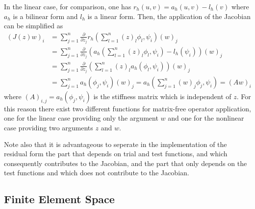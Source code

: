 \documentclass[a4paper,12pt]{article}
\begin{document}
In the linear case, for comparison, one has $r_h(u,v) = a_h(u,v) - l_h(v)$ where
$a_h$ is a bilinear form and $l_h$ is a linear form. Then, the application
of the Jacobian can be simplified as
\begin{equation*}
\begin{split}
(J(z) w)_i &= \sum_{j=1}^n
\frac{\partial}{\partial z_j} r_h\left(\sum_{l=1}^n (z)_l  \phi_l,\psi_i\right) (w)_j \\
&= \sum_{j=1}^n \frac{\partial}{\partial z_j} \left(
a_h\left(\sum_{l=1}^n (z)_l  \phi_l,\psi_i\right) - l_h(\psi_i)\right) (w)_j \\
&= \sum_{j=1}^n \frac{\partial}{\partial z_j} \left(
\sum_{l=1}^n (z)_l a_h(\phi_l,\psi_i) \right)  (w)_j \\
&= \sum_{j=1}^n a_h(\phi_j,\psi_i) (w)_j =
a_h\left( \sum_{j=1}^n (w)_j \phi_j,\psi_i\right) =
(A w)_i
\end{split}
\end{equation*}
where $(A)_{i,j} = a_h(\phi_j,\psi_i)$ is the stiffness matrix which is independent of $z$.
For this reason there exist two different functions for matrix-free operator application,
one for the linear case providing only the argument $w$ and one for the nonlinear
case providing two arguments $z$ and $w$.

Note also that it is advantageous to seperate in the
implementation of the residual form the part that depends on trial and test functions,
and which consequently contributes to the Jacobian, and the part that only depends
on the test functions and which does not contribute to the Jacobian.

\subsection{Finite Element Space}
\end{document}
